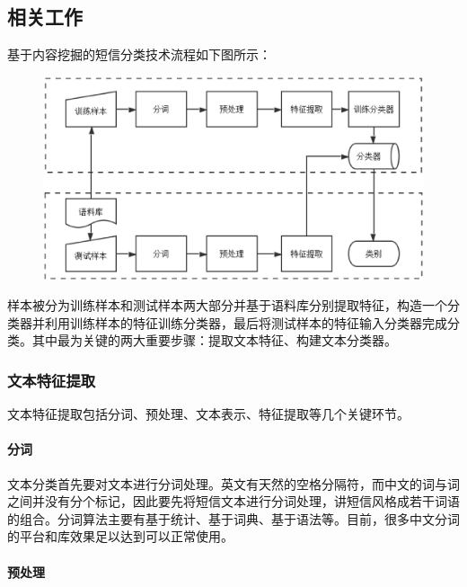 \subsection{相关工作}\label{ux76f8ux5173ux5de5ux4f5c}

基于内容挖掘的短信分类技术流程如下图所示：

\begin{figure}[htbp]
\centering
\includegraphics{./images/text_classfication.eps}
\caption{}
\end{figure}

样本被分为训练样本和测试样本两大部分并基于语料库分别提取特征，构造一个分类器并利用训练样本的特征训练分类器，最后将测试样本的特征输入分类器完成分类。其中最为关键的两大重要步骤：提取文本特征、构建文本分类器。

\subsubsection{文本特征提取}\label{ux6587ux672cux7279ux5f81ux63d0ux53d6}

文本特征提取包括分词、预处理、文本表示、特征提取等几个关键环节。

\paragraph{分词}\label{ux5206ux8bcd}

文本分类首先要对文本进行分词处理。英文有天然的空格分隔符，而中文的词与词之间并没有分个标记，因此要先将短信文本进行分词处理，讲短信风格成若干词语的组合。分词算法主要有基于统计、基于词典、基于语法等。目前，很多中文分词的平台和库效果足以达到可以正常使用。

\paragraph{预处理}\label{ux9884ux5904ux7406}

